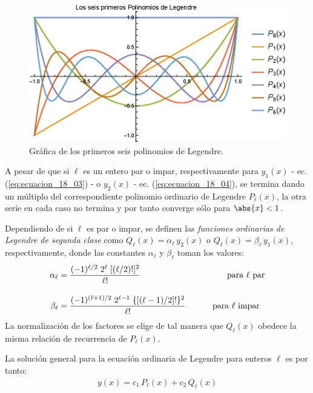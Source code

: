 \begin{figure}[H]
    \centering
    \includegraphics[scale=1.2]{Imagenes/Plot_Lagrange_0-6.eps}
    \caption{Gráfica de los primeros seis polinomios de Legendre.}
    \label{fig:polinomios_Lagrange_01}
\end{figure}
A pesar de que si $\ell$ es un entero par o impar, respectivamente para $y_{1}(x)$ - ec. (\ref{eq:ecuacion_18_03}) - o $y_{2}(x)$ - ec. (\ref{eq:ecuacion_18_04}), se termina dando un múltiplo del correspondiente polinomio ordinario de Legendre $P_{\ell}(x)$, la otra serie en cada caso no termina y por tanto converge sólo para $\abs{x} < 1$.
\par
Dependiendo de si $\ell$ es par o impar, se definen las \emph{funciones ordinarias de Legendre de segunda clase} como $Q_{\ell}(x) =  \alpha_{\ell} \, y_{2}(x)$ o $Q_{\ell}(x) =  \beta_{\ell} \, y_{1}(x)$, respectivamente, donde las constantes $\alpha_{\ell}$ y $\beta_{\ell}$ toman los valores:
\begin{align}
\alpha_{\ell} &= \dfrac{(-1)^{\ell/2} \; 2^{\ell} \; [(\ell / 2)!]^{2}}{\ell!} \hspace{3.5cm} \mbox{ para $\ell$ par} \label{eq:ecuacion_18_05}\\[1em]
\beta_{\ell} &= \dfrac{(-1)^{(\ell + 1)/2} \; 2^{\ell - 1} \; \lbrace \left[ (\ell - 1) /2 \right] ! \rbrace^{2}}{\ell!} \hspace{1cm} \mbox{ para $\ell$ impar} \label{eq:ecuacion_18_06}
\end{align}
La normalización de los factores se elige de tal manera que $Q_{\ell}(x)$ obedece la misma relación de recurrencia de $P_{\ell}(x)$.
\par
La solución general para la ecuación ordinaria de Legendre para enteros $\ell$ es por tanto:
\begin{align}
y(x) = c_{1} \, P_{\ell}(x) + c_{2} \, Q_{\ell} (x) 
\label{eq:ecuacion_18_07}
\end{align}
